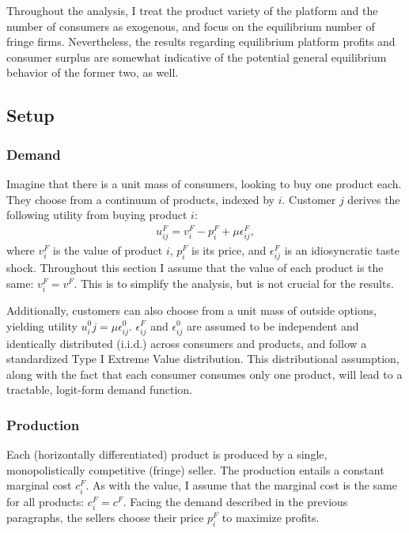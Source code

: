 \documentclass[a4paper]{article}
\begin{document}
Throughout the analysis, I treat the product variety of the platform and the number of consumers as exogenous, and focus on the equilibrium number of fringe firms.
Nevertheless, the results regarding equilibrium platform profits and consumer surplus are somewhat indicative of the potential general equilibrium behavior of the former two, as well.

\subsection{Setup}

\subsubsection{Demand}

Imagine that there is a unit mass of consumers, looking to buy one product each.
They choose from a continuum of products, indexed by $i$.
Customer $j$ derives the following utility from buying product $i$:
\begin{align*}
    u^F_{ij} = v^F_i - p^F_i + \mu\epsilon^F_{ij},
\end{align*}
where $v^F_i$ is the value of product $i$, $p^F_i$ is its price, and $\epsilon^F_{ij}$ is an idiosyncratic taste shock.
Throughout this section I assume that the value of each product is the same: $v^F_i = v^F$.
This is to simplify the analysis, but is not crucial for the results.

Additionally, customers can also choose from a unit mass of outside options, yielding utility $u^0_ij = \mu\epsilon^0_{ij}$. $\epsilon^F_{ij}$ and $\epsilon^0_{ij}$ are assumed to be independent and identically distributed (i.i.d.) across consumers and products, and follow a standardized Type I Extreme Value distribution. This distributional assumption, along with the fact that each consumer consumes only one product, will lead to a tractable, logit-form demand function.

\subsubsection{Production}

Each (horizontally differentiated) product is produced by a single, monopolistically competitive (fringe) seller.
The production entails a constant marginal cost $c^F_i$.
As with the value, I assume that the marginal cost is the same for all products: $c^F_i = c^F$.
Facing the demand described in the previous paragraphs, the sellers choose their price $p^F_i$ to maximize profits.
\end{document}
